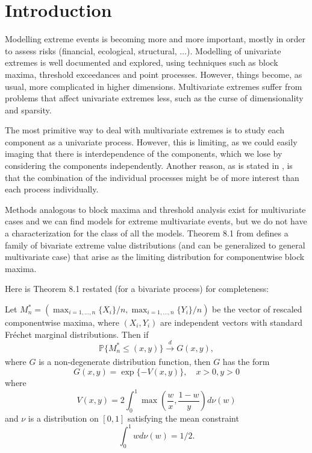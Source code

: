 \chapter{Introduction}
\label{sec:intro}

Modelling extreme events is becoming more and more important, mostly in order to assess risks (financial, ecological, structural, $\ldots$). Modelling of univariate extremes is well documented and explored, using techniques such as block maxima, threshold exceedances and point processes.
However, things become, as usual, more complicated in higher dimensions. Multivariate extremes suffer from problems that affect univariate extremes less, such as the curse of dimensionality and sparsity.

The most primitive way to deal with multivariate extremes is to study each component as a univariate process. However, this is limiting, as we could easily imaging that there is interdependence of the components, which we lose by considering the components independently. Another reason, as is stated in \cite{Coles}, is that the combination of the individual processes might be of more interest than each process individually.

Methods analogous to block maxima and threshold analysis exist for multivariate cases and we can find models for extreme multivariate events, but we do not have a characterization for the class of all the models. Theorem 8.1 from \cite{Coles} defines a family of bivariate extreme value distributions (and can be generalized to general multivariate case) that arise as the limiting distribution for componentwise block maxima. 

Here is Theorem 8.1 restated (for a bivariate process) for completeness:

\begin{theorem}

Let $M^*_n = (\max_{i=1,...,n} \{X_i\}/n, \max_{i=1,...,n} \{Y_i\}/n)$ be the vector of rescaled componentwise maxima, where $(X_i,Y_i)$ are independent vectors with standard Fréchet marginal distributions. Then if
$$
\mathbb{P}\{M^*_n \leq (x,y) \} \xrightarrow[]{d} G(x,y),
$$
where $G$ is a non-degenerate distribution function, then $G$ has the form
$$
G(x,y) = \exp\{-V(x,y)\}, \quad x>0, y>0
$$
where
$$
V(x,y) = 2 \int^1_0 \max \left(\frac{w}{x},\frac{1-w}{y}\right)d\nu(w)
$$
and $\nu$ is a distribution on $[0,1]$ satisfying the mean constraint
$$
\int_0^1 wd\nu(w) = 1/2.
$$


\end{theorem}


